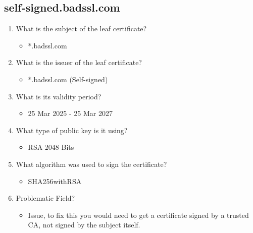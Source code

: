 \documentclass[11pt]{article}
\begin{document}
\subsection{self-signed.badssl.com}
\label{sec:org3da28cc}
\begin{enumerate}
\item What is the subject of the leaf certificate?
\begin{itemize}
\item *.badssl.com
\end{itemize}
\item What is the issuer of the leaf certificate?
\begin{itemize}
\item *.badssl.com (Self-signed)
\end{itemize}
\item What is its validity period?
\begin{itemize}
\item 25 Mar 2025 - 25 Mar 2027
\end{itemize}
\item What type of public key is it using?
\begin{itemize}
\item RSA 2048 Bits
\end{itemize}
\item What algorithm was used to sign the certificate?
\begin{itemize}
\item SHA256withRSA
\end{itemize}
\item Problematic Field?
\begin{itemize}
\item Issue, to fix this you would need to get a certificate signed by a trusted CA, not signed by the subject itself.
\end{itemize}
\end{enumerate}
\end{document}
